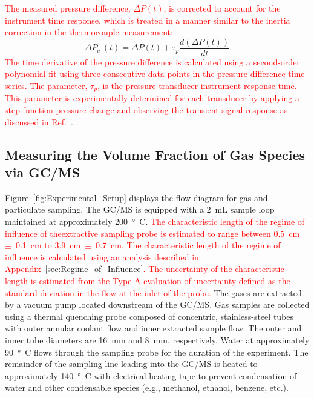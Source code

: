\documentclass[12pt]{article}
\begin{document}
\textcolor{red}{The measured pressure difference, $\Delta P(t)$, is corrected to account for the instrument time response, which is treated in a manner similar to the inertia correction in the thermocouple measurement:}
\begin{equation}\label{eq:Delta_Pc}
\Delta P_c~(t) = \Delta P(t)+\tau_{p}\frac{d(\Delta P(t))}{dt}
\end{equation}
\textcolor{red}{The time derivative of the pressure difference is calculated using a second-order polynomial fit using three consecutive data points in the pressure difference time series. The parameter, $\tau_p$, is the pressure transducer instrument response time. This parameter is experimentally determined for each transducer by applying a step-function pressure change and observing the transient signal response as discussed in Ref.~\cite{Sung2021}}.

\subsection{Measuring the Volume Fraction of Gas Species via GC/MS}
\label{ssec:Gas_Species_Setup}

Figure~\ref{fig:Experimental_Setup} displays the flow diagram for gas and particulate sampling. The GC/MS is equipped with a 2~mL sample loop maintained at approximately \SI{200}{\degree C}. \textcolor{red}{The characteristic length of the regime of influence of theextractive sampling probe is estimated to range between 0.5~cm~$\pm$~0.1~cm to 3.9~cm~$\pm$~0.7~cm. The characteristic length of the regime of influence is calculated using an analysis described in Appendix~\ref{sec:Regime_of_Influence}. The uncertainty of the characteristic length is estimated from the Type A evaluation of uncertainty defined as the standard deviation in the flow at the inlet of the probe.} The gases are extracted by a vacuum pump located downstream of the GC/MS. Gas samples are collected using a thermal quenching probe composed of concentric, stainless-steel tubes with outer annular coolant flow and inner extracted sample flow. The outer and inner tube diameters are \SI{16}{mm} and \SI{8}{mm}, respectively. Water at approximately \SI{90}{\degree C} flows through the sampling probe for the duration of the experiment. The remainder of the sampling line leading into the GC/MS is heated to approximately \SI{140}{\degree C} with electrical heating tape to prevent condensation of water and other condensable species (e.g., methanol, ethanol, benzene, etc.).
\end{document}
